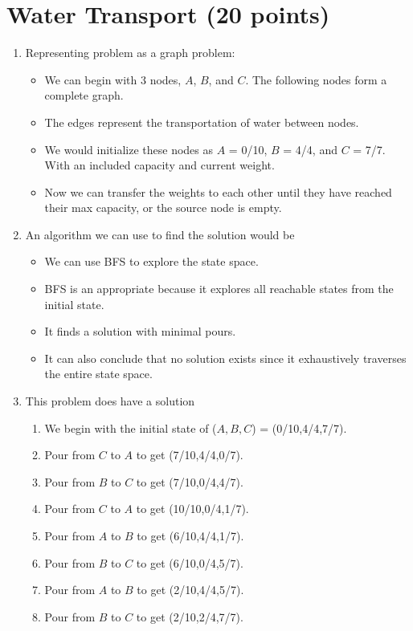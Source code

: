 \documentclass{article}[12pt]
\begin{document}
\section{Water Transport (20 points)}
\begin{enumerate}
  \item Representing problem as a graph problem:
    \begin{itemize}
      \item We can begin with 3 nodes, $A$, $B$, and $C$. The following nodes form a complete graph.
      \item The edges represent the transportation of water between nodes.
      \item We would initialize these nodes as $A$ = 0/10, $B$ = 4/4, and $C$ = 7/7.
        With an included capacity and current weight.
      \item Now we can transfer the weights to each other until they have reached their max capacity, or the source node is empty.
    \end{itemize}
  \item An algorithm we can use to find the solution would be
    \begin{itemize}
      \item We can use BFS to explore the state space.
      \item BFS is an appropriate because it explores all reachable states from the initial state.
      \item It finds a solution with minimal pours.
      \item It can also conclude that no solution exists since it exhaustively traverses the entire state space.
    \end{itemize}
    \item This problem does have a solution
      \begin{enumerate}
        \item We begin with the initial state of ($A,B,C$) = (0/10,4/4,7/7).
        \item Pour from $C$ to $A$ to get (7/10,4/4,0/7).
        \item Pour from $B$ to $C$ to get (7/10,0/4,4/7).
        \item Pour from $C$ to $A$ to get (10/10,0/4,1/7).
        \item Pour from $A$ to $B$ to get (6/10,4/4,1/7).
        \item Pour from $B$ to $C$ to get (6/10,0/4,5/7). %
        \item Pour from $A$ to $B$ to get (2/10,4/4,5/7).
        \item Pour from $B$ to $C$ to get (2/10,2/4,7/7).
      \end{enumerate}
\end{enumerate}
\end{document}
